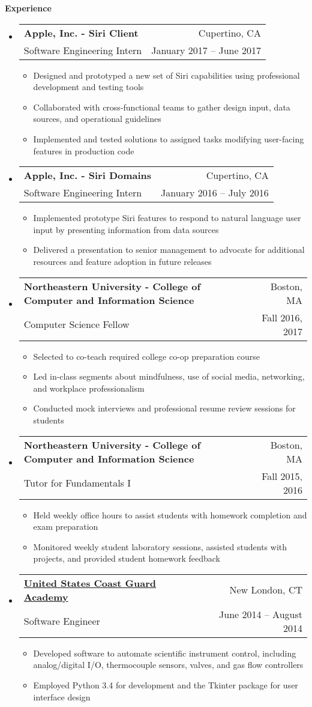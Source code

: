\documentclass[letterpaper,10.6pt]{article}
\makeatletter
\newcommand{\resitem}[1]{\item #1 \vspace{-2pt}}
\newcommand{\resheading}[1]{{\large \colorbox{mygrey}{\begin{minipage}{\textwidth}{\textbf{#1 \vphantom{p\^{E}}}}\end{minipage}}}}
\newcommand{\ressubheading}[4]{
\begin{tabular*}{6.8in}{l@{\extracolsep{\fill}}r}
		\textbf{#1} & #2 \\
		\small{#3} & \small{#4} \\
\end{tabular*}\vspace{-6pt}}
\makeatother
\begin{document}
\resheading{Experience}
	\begin{itemize}[leftmargin=*]
		\item[]
			\ressubheading{Apple, Inc. - \small{Siri Client}}{Cupertino, CA}{Software Engineering Intern}{January 2017 -- June 2017}
			{\footnotesize
				\begin{itemize}
					\resitem{Designed and prototyped a new set of Siri capabilities using professional development and testing tools}
					\resitem{Collaborated with cross-functional teams to gather design input, data sources, and operational guidelines}
					\resitem{Implemented and tested solutions to assigned tasks modifying user-facing features in production code}
				\end{itemize}}
		\item[]
			\ressubheading{Apple, Inc. - \small{Siri Domains}}{Cupertino, CA}{Software Engineering Intern}{January 2016 -- July 2016}
			{\footnotesize
				\begin{itemize}
					\resitem{Implemented prototype Siri features to respond to natural language user input by presenting information from data sources}
					\resitem{Delivered a presentation to senior management to advocate for additional resources and feature adoption in future releases}
				\end{itemize}}
		\item[]
			\ressubheading{Northeastern University - \small{College of Computer and Information Science}}{Boston, MA}{Computer Science Fellow}{Fall 2016, 2017}
			{\footnotesize
				\begin{itemize}
					\resitem{Selected to co-teach required college co-op preparation course}
					\resitem{Led in-class segments about mindfulness, use of social media, networking, and workplace professionalism}
					\resitem{Conducted mock interviews and professional resume review sessions for students}
			\end{itemize}}
		\item[]
			\ressubheading{Northeastern University - \small{College of Computer and Information Science}}{Boston, MA}{Tutor for Fundamentals I}{Fall 2015, 2016}
			{\footnotesize
				\begin{itemize}
					\resitem{Held weekly office hours to assist students with homework completion and exam preparation}
					\resitem{Monitored weekly student laboratory sessions, assisted students with projects, and provided student homework feedback}
				\end{itemize}}
		\item[] 
			\ressubheading{\href{http://www.uscga.edu}{United States Coast Guard Academy}}{New London, CT}
				{Software Engineer}{June 2014 -- August 2014}
				{\footnotesize
				\begin{itemize}
					\resitem{Developed software to automate scientific instrument control, including analog/digital I/O, thermocouple sensors, valves, and gas flow controllers}
					\resitem{Employed Python 3.4 for development and the Tkinter package for user interface design}
				\end{itemize}}
	\end{itemize} 
\end{document}
